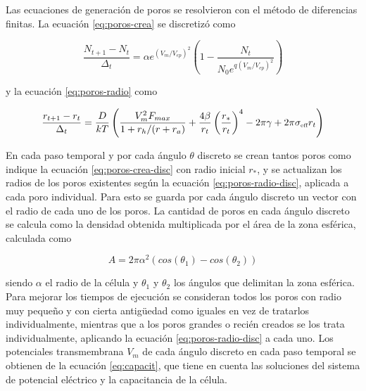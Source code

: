 \documentclass[a4paper,10pt]{article}
\begin{document}
Las ecuaciones de generación de poros se resolvieron con el método de diferencias finitas. La ecuación \ref{eq:poros-crea} se discretizó como

\begin{equation} \label{eq:poros-crea-disc}
	\frac{N_{t+1} - N_{t}}{\Delta_t} = \alpha e^{(V_m/V_{ep})^2} \left( 1 - \frac{N_{t}}{N_0 e^{q \left(V_m / V_{ep} \right) ^2}} \right)
\end{equation}

y la ecuación \ref{eq:poros-radio} como

\begin{equation} \label{eq:poros-radio-disc}
	\frac{r_{t+1} - r_t}{\Delta_t} = \frac{D}{kT} \left( \frac{V_m^2 F_{max}}{1+r_h / (r+r_a)} + \frac{4 \beta}{r_t} \left(\frac{r_*}{r_t}\right)^4 - 2 \pi \gamma + 2 \pi \sigma_{\textrm{\tiny eff}} r_t \right)
\end{equation}


En cada paso temporal y por cada ángulo $\theta$ discreto se crean tantos poros como indique la ecuación \ref{eq:poros-crea-disc} con radio inicial $r_*$, y se actualizan los radios de los poros existentes según la ecuación \ref{eq:poros-radio-disc}, aplicada a cada poro individual. Para esto se guarda por cada ángulo discreto un vector con el radio de cada uno de los poros. La cantidad de poros en cada ángulo discreto se calcula como la densidad obtenida multiplicada por el área de la zona esférica, calculada como 

\begin{equation}
	A = 2 \pi \alpha^2 (cos(\theta_1) - cos(\theta_2))
\end{equation}

siendo $\alpha$ el radio de la célula y $\theta_1$ y $\theta_2$ los ángulos que delimitan la zona esférica.\\

Para mejorar los tiempos de ejecución se consideran todos los poros con radio muy pequeño y con cierta antigüedad como iguales en vez de tratarlos individualmente, mientras que a los poros grandes o recién creados se los trata individualmente, aplicando la ecuación \ref{eq:poros-radio-disc} a cada uno. Los potenciales transmembrana $V_m$ de cada ángulo discreto en cada paso temporal se obtienen de la ecuación \ref{eq:capacit}, que tiene en cuenta las soluciones del sistema de potencial eléctrico y la capacitancia de la célula.\\
\end{document}
